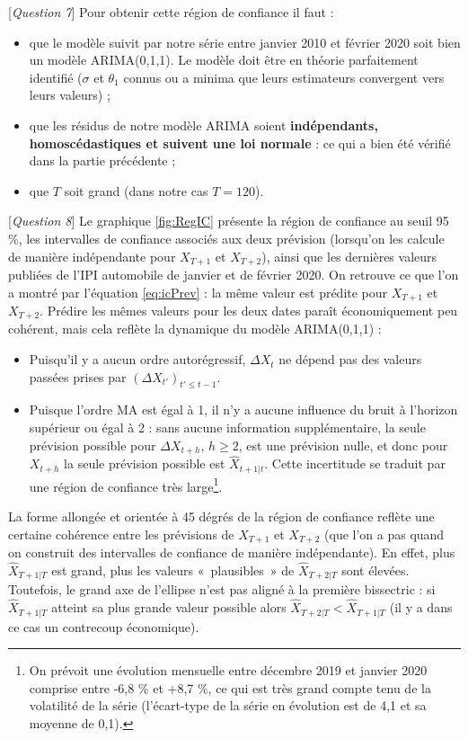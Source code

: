 \documentclass[,french]{article}
\providecommand{\tightlist}{%
  \setlength{\itemsep}{0pt}\setlength{\parskip}{0pt}}
\let\rmarkdownfootnote\footnote%
\def\footnote{\protect\rmarkdownfootnote}
\begin{document}
{[}\emph{Question 7}{]} Pour obtenir cette région de confiance il faut :

\begin{itemize}
\tightlist
\item
  que le modèle suivit par notre série entre janvier 2010 et février 2020 soit bien un modèle ARIMA(0,1,1). Le modèle doit être en théorie parfaitement identifié (\(\sigma\) et \(\theta_1\) connus ou a minima que leurs estimateurs convergent vers leurs valeurs) ;
\item
  que les résidus de notre modèle ARIMA soient \textbf{indépendants, homoscédastiques et suivent une loi normale} : ce qui a bien été vérifié dans la partie précédente ;
\item
  que \(T\) soit grand (dans notre cas \(T=120\)).
\end{itemize}

{[}\emph{Question 8}{]} Le graphique \ref{fig:RegIC} présente la région de confiance au seuil 95 \%, les intervalles de confiance associés aux deux prévision (lorsqu'on les calcule de manière indépendante pour \(X_{T+1}\) et \(X_{T+2}\)), ainsi que les dernières valeurs publiées de l'IPI automobile de janvier et de février 2020.
On retrouve ce que l'on a montré par l'équation \eqref{eq:icPrev} : la même valeur est prédite pour \(X_{T+1}\) et \(X_{T+2}\).
Prédire les mêmes valeurs pour les deux dates paraît économiquement peu cohérent, mais cela reflète la dynamique du modèle ARIMA(0,1,1) :

\begin{itemize}
\item
  Puisqu'il y a aucun ordre autorégressif, \(\Delta X_t\) ne dépend pas des valeurs passées prises par \((\Delta X_{t'})_{t'\leq t-1}\).
\item
  Puisque l'ordre MA est égal à 1, il n'y a aucune influence du bruit à l'horizon supérieur ou égal à 2 : sans aucune information supplémentaire, la seule prévision possible pour \(\Delta X_{t+h}\), \(h\geq 2\), est une prévision nulle, et donc pour \(X_{t+h}\) la seule prévision possible est \(\widehat X_{t+1\vert t}\).
  Cette incertitude se traduit par une région de confiance très large\footnote{On prévoit une évolution mensuelle entre décembre 2019 et janvier 2020 comprise entre -6,8 \% et +8,7 \%, ce qui est très grand compte tenu de la volatilité de la série (l'écart-type de la série en évolution est de 4,1 et sa moyenne de 0,1).}.
\end{itemize}

La forme allongée et orientée à 45 dégrés de la région de confiance reflète une certaine cohérence entre les prévisions de \(X_{T+1}\) et \(X_{T+2}\) (que l'on a pas quand on construit des intervalles de confiance de manière indépendante).
En effet, plus \(\widehat X_{T+1\vert T}\) est grand, plus les valeurs «~plausibles~» de \(\widehat X_{T+2\vert T}\) sont élevées.
Toutefois, le grand axe de l'ellipse n'est pas aligné à la première bissectric : si \(\widehat X_{T+1\vert T}\) atteint sa plus grande valeur possible alors \(\widehat X_{T+2\vert T}<\widehat X_{T+1\vert T}\) (il y a dans ce cas un contrecoup économique).
\end{document}
